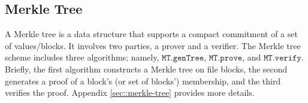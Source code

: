 


\vs

\subsection{Merkle Tree}\label{sec::merkle-tree-short}


A Merkle tree is a data structure that supports a compact commitment of a set of values/blocks.  It involves two parties, a prover and a verifier. 
%
The Merkle tree scheme includes three algorithms; namely, $\mathtt{MT.genTree}$, $ \mathtt{MT.prove}$, and  $\mathtt{MT.verify}$. Briefly, the first algorithm constructs a Merkle tree on file blocks, the second generates a proof of a block's (or set of blocks') membership, and the third verifies the proof. Appendix \ref{sec::merkle-tree} provides more details. 

%
%
%
%
%
%
